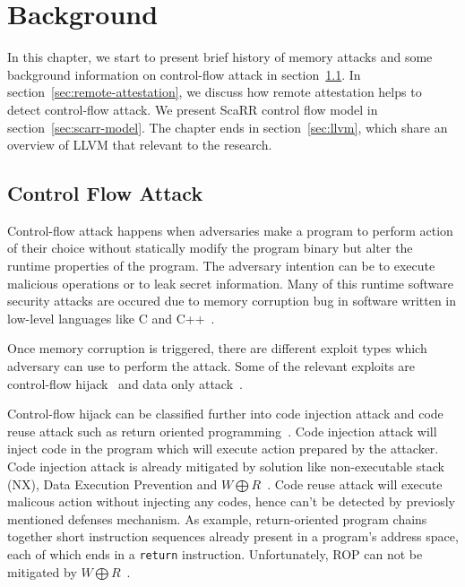 
\chapter{Background} %

\label{Chapter3} %

In this chapter, we start to present brief history of memory attacks and some
background information on control-flow attack in
section~\ref{sec:control-flow-attack}. In section~\ref{sec:remote-attestation},
we discuss how remote attestation helps to detect control-flow attack. We
present ScaRR control flow model in section~\ref{sec:scarr-model}. The chapter
ends in section~\ref{sec:llvm}, which share an overview of LLVM that relevant to
the research. 

\section{Control Flow Attack}
\label{sec:control-flow-attack}

Control-flow attack happens when adversaries make a program to perform action of
their choice without statically modify the program binary but alter the runtime
properties of the program. The adversary intention can be to execute malicious
operations or to leak secret information. Many of this runtime software security
attacks are occured due to memory corruption bug in software written in
low-level languages like C and C++~\cite{szekeresSoKEternalWar2013}.

Once memory corruption is triggered, there are different exploit types which
adversary can use to perform the attack. Some of the relevant exploits are
control-flow hijack~\cite{shachamGeometryInnocentFlesh2007,
schusterCounterfeitObjectorientedProgramming2015}  and data only
attack~\cite{chenNonControlDataAttacksAre2005,
carliniControlFlowBendingEffectiveness2015}. 

Control-flow hijack can be classified further into code injection attack and
code reuse attack such as return oriented
programming~\cite{roemerReturnorientedProgrammingSystems2012}.  Code injection
attack will inject code in the program which will execute action prepared by the
attacker. Code injection attack is already mitigated by solution like
non-executable stack (NX), Data Execution Prevention and \( W \bigoplus R
\)~\cite{vanderveenMemoryErrorsPresent2012}. Code reuse attack will execute
malicous action without injecting any codes, hence can't be detected by
previosly mentioned defenses mechanism. As example, return-oriented program
chains together short instruction sequences already present in a program’s
address space, each of which ends in a \texttt{return} instruction.
Unfortunately, ROP can not be mitigated by \( W \bigoplus R
\)~\cite{roemerReturnorientedProgrammingSystems2012}.


